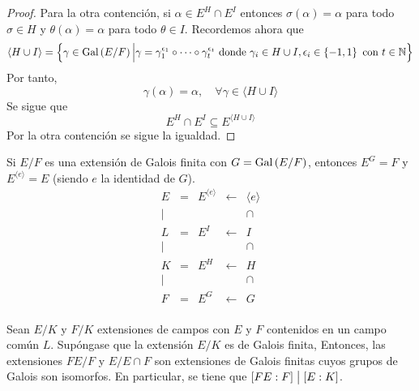 \documentclass[12pt]{report}
\theoremstyle{largebreak}
\newcommand\divides{\ensuremath{\bigm|}}
\begin{document}
\begin{proof}
        Para la otra contención, si $\alpha\in E^H\cap E^I$ entonces $\sigma(\alpha)=\alpha$ para todo $\sigma\in H$ y $\theta(\alpha)=\alpha$ para todo $\theta\in I$. Recordemos ahora que
        \begin{equation*}
            \langle H\cup I \rangle=\left\{\gamma\in \textup{Gal}\left(E/F\right)\Big|\gamma=\gamma_1^{\epsilon_1}\circ\cdots\circ\gamma_t^{\epsilon_t} \textup{ donde }\gamma_i\in H\cup I,\epsilon_i\in\left\{-1,1\right\} \textup{ con }t\in\mathbb{N} \right\}
        \end{equation*}
        Por tanto,
        \begin{equation*}
            \gamma(\alpha)=\alpha,\quad\forall \gamma\in\langle H\cup I \rangle
        \end{equation*}
        Se sigue que
        \begin{equation*}
            E^{H}\cap E^I\subseteq E^{\langle H\cup I \rangle}
        \end{equation*}
        Por la otra contención se sigue la igualdad.
    \end{proof}

    \begin{obs}
        Si $E/F$ es una extensión de Galois finita con $G=\textup{Gal}\left(E/F\right)$, entonces $E^G=F$ y $E^{ \langle e\rangle}=E$ (siendo $e$ la identidad de $G$).
        \begin{equation*}
            \begin{array}{ccccc}
                E & = & E^{\langle e\rangle} & \longleftarrow & \langle e\rangle \\
                | & & & & \cap \\
                L & = & E^I & \longleftarrow & I \\
                | & & & & \cap \\
                K & = & E^H & \longleftarrow & H \\
                | & & & & \cap \\
                F & = & E^G & \longleftarrow & G \\
            \end{array}
        \end{equation*}
    \end{obs}

    \begin{propo}
        Sean $E/K$ y $F/K$ extensiones de campos con $E$ y $F$ contenidos en un campo común $L$. Supóngase que la extensión $E/K$ es de Galois finita, Entonces, las extensiones $FE/F$ y $E/E\cap F$ son extensiones de Galois finitas cuyos grupos de Galois son isomorfos. En particular, se tiene que $[FE:F]\divides [E:K]$.
    \end{propo}
\end{document}
